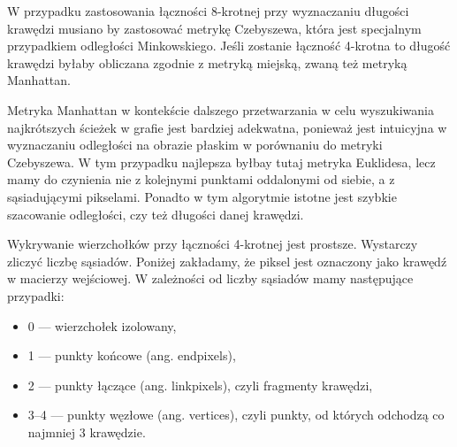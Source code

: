 \documentclass[a4paper,11pt,twoside]{report}
\theoremstyle{definition}
\begin{document}
W przypadku zastosowania łączności 8-krotnej przy wyznaczaniu długości krawędzi musiano by zastosować metrykę Czebyszewa, która jest specjalnym przypadkiem odległości Minkowskiego. Jeśli zostanie łączność 4-krotna to długość krawędzi byłaby obliczana zgodnie z metryką miejską, zwaną też metryką Manhattan. 

Metryka Manhattan w kontekście dalszego przetwarzania w celu wyszukiwania najkrótszych ścieżek w grafie jest bardziej adekwatna, ponieważ jest intuicyjna w wyznaczaniu odległości na obrazie płaskim w porównaniu do metryki Czebyszewa. W tym przypadku najlepsza byłbay tutaj metryka Euklidesa, lecz mamy do czynienia nie z kolejnymi punktami oddalonymi od siebie, a z sąsiadującymi pikselami. Ponadto w tym algorytmie istotne jest szybkie szacowanie odległości, czy też długości danej krawędzi.

Wykrywanie wierzchołków przy łączności 4-krotnej jest prostsze. Wystarczy zliczyć liczbę sąsiadów. Poniżej zakładamy, że piksel jest oznaczony jako krawędź w macierzy wejściowej. W zależności od liczby sąsiadów mamy następujące przypadki:
\begin{itemize}[noitemsep]
\item 0 --- wierzchołek izolowany,
\item 1 --- punkty końcowe (ang. endpixels),
\item 2 --- punkty łączące (ang. linkpixels), czyli fragmenty krawędzi,
\item 3--4 --- punkty węzłowe (ang. vertices), czyli punkty, od których odchodzą co najmniej 3 krawędzie.
\end{itemize}
\end{document}
